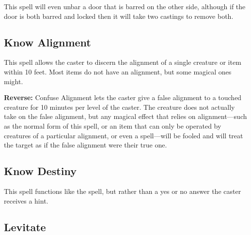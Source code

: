 \begin{multicols*}{2}
This spell will even unbar a door that is barred on the other side, although if the door is both barred and locked then it will take two castings to remove both.

\subsection{Know Alignment}\label{spell:Know Alignment}

This spell allows the caster to discern the alignment of a single creature or item within 10 feet. Most items do not have an alignment, but some magical ones might.

\textbf{Reverse:} \hypertarget{spell:Confuse Alignment}{Confuse Alignment} lets the caster give a false alignment to a touched creature for 10 minutes per level of the caster. The creature does not actually take on the false alignment, but any magical effect that relies on alignment—such as the normal form of this spell, or an item that can only be operated by creatures of a particular alignment, or even a  spell—will be fooled and will treat the target as if the false alignment were their true one.

\subsection{Know Destiny}\label{spell:Know Destiny}

This spell functions like the  spell, but rather than a yes or no answer the caster receives a hint.

\subsection{Levitate}\label{spell:Levitate}
\end{multicols*}
